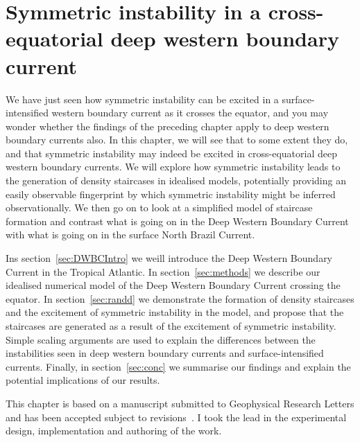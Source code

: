 \chapter{Symmetric instability in a cross-equatorial deep western boundary current}
\label{chap:4}

We have just seen how symmetric instability can be excited in a surface-intensified western boundary current as it crosses the equator, and you may wonder whether the findings of the preceding chapter apply to deep western boundary currents also. In this chapter, we will see that to some extent they do, and that symmetric instability may indeed be excited in cross-equatorial deep western boundary currents. We will explore how symmetric instability leads to the generation of density staircases in idealised models, potentially providing an easily observable fingerprint by which symmetric instability might be inferred observationally. We then go on to look at a simplified model of staircase formation and contrast what is going on in the Deep Western Boundary Current with what is going on in the surface North Brazil Current.

Ins section~\ref{sec:DWBCIntro} we weill introduce the Deep Western Boundary Current in the Tropical Atlantic. In section~\ref{sec:methods} we describe our idealised numerical model of the Deep Western Boundary Current crossing the equator. In section~\ref{sec:randd} we demonstrate the formation of density staircases and the excitement of symmetric instability in the model, and propose that the staircases are generated as a result of the excitement of symmetric instability. Simple scaling arguments are used to explain the differences between the instabilities seen in deep western boundary currents and surface-intensified currents. Finally, in section~\ref{sec:conc} we summarise our findings and explain the potential implications of our results.

This chapter is based on a manuscript submitted to Geophysical Research Letters and has been accepted subject to revisions~\citep{Goldsworth2022}. I took the lead in the experimental design, implementation and authoring of the work.

